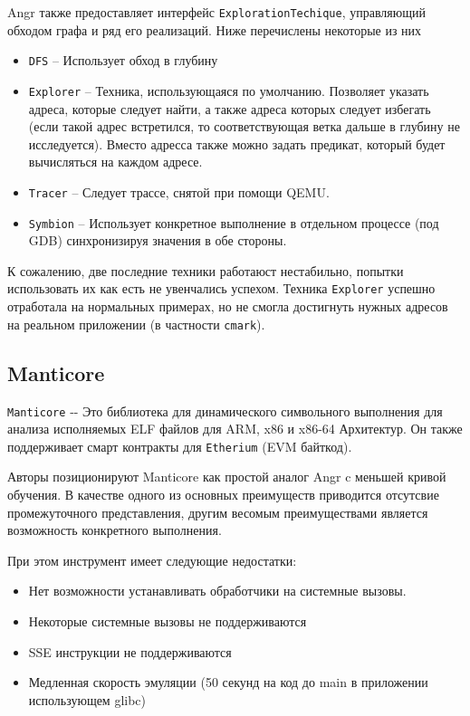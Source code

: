 Angr также предоставляет интерфейс \texttt{ExplorationTechique}, управляющий обходом графа и ряд его реализаций. Ниже перечислены некоторые из них

\begin{itemize}
    \item \texttt{DFS} -- Использует обход в глубину
    \item \texttt{Explorer} -- Техника, использующаяся по умолчанию. Позволяет указать адреса, которые следует найти, а также адреса которых следует избегать (если такой адрес встретился, то соответствующая ветка дальше в глубину не исследуется). Вместо адресса также можно задать предикат, который будет вычисляться на каждом адресе.
    \item \texttt{Tracer} -- Следует трассе, снятой при помощи QEMU.
    \item \texttt{Symbion} -- Использует конкретное выполнение в отдельном процессе (под GDB) синхронизируя значения в обе стороны.
\end{itemize}

К сожалению, две последние техники работаюст нестабильно, попытки использовать их как есть не увенчались успехом. Техника \texttt{Explorer} успешно отработала на нормальных примерах, но не смогла достигнуть нужных адресов на реальном приложении (в частности \texttt{cmark}).


\subsection{Manticore}

\texttt{Manticore} \cite{trailofbits-manticore} ‑- Это библиотека для динамического символьного выполнения для анализа исполняемых ELF файлов для ARM, x86 и x86-64 Архитектур. Он также поддерживает смарт контракты для \texttt{Etherium} (EVM байткод).

Авторы позиционируют Manticore как простой аналог Angr c меньшей кривой обучения. В качестве одного из основных преимуществ приводится отсутсвие промежуточного представления, другим весомым преимуществами является возможность конкретного выполнения.

При этом инструмент имеет следующие недостатки:

\begin{itemize}
    \item Нет возможности устанавливать обработчики на системные вызовы.
    \item Некоторые системные вызовы не поддерживаются
    \item SSE инструкции не поддерживаются
    \item Медленная скорость эмуляции (50 секунд на код до main в приложении использующем glibc)
\end{itemize}


